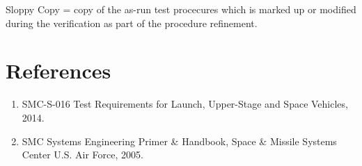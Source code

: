 \documentclass[12pt]{article}
\begin{document}
Sloppy Copy = copy of the as-run test procecures which is marked up or modified during the verification as part of the procedure refinement.

\section*{References}

\begin{enumerate}
\item SMC-S-016 Test Requirements for Launch, Upper-Stage and Space Vehicles, 2014.
\item SMC Systems Engineering Primer \& Handbook, Space \& Missile Systems Center U.S. Air Force, 2005.
\end{enumerate}
\end{document}

